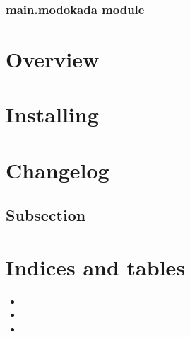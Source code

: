\documentclass[letterpaper,10pt,english]{sphinxmanual}
\begin{document}

\begin{fulllineitems}
\label{\detokenize{main:main.modfilters.physical_filter}}
\pysigstartsignatures
{}
\pysigstopsignatures
\end{fulllineitems}



\subsection{main.modokada module}
\label{\detokenize{main:main-modokada-module}}
\sphinxstepscope


\chapter{Overview}
\label{\detokenize{overview:overview}}\label{\detokenize{overview::doc}}
\sphinxstepscope


\chapter{Installing}
\label{\detokenize{installing:installing}}\label{\detokenize{installing::doc}}
\sphinxstepscope


\chapter{Changelog}
\label{\detokenize{changelog:changelog}}\label{\detokenize{changelog::doc}}

\section{Subsection}
\label{\detokenize{changelog:subsection}}

\chapter{Indices and tables}
\label{\detokenize{index:indices-and-tables}}\begin{itemize}
\item {} 
\sphinxAtStartPar
{}

\item {} 
\sphinxAtStartPar
{}

\item {} 
\sphinxAtStartPar
{}

\end{itemize}
\end{document}
